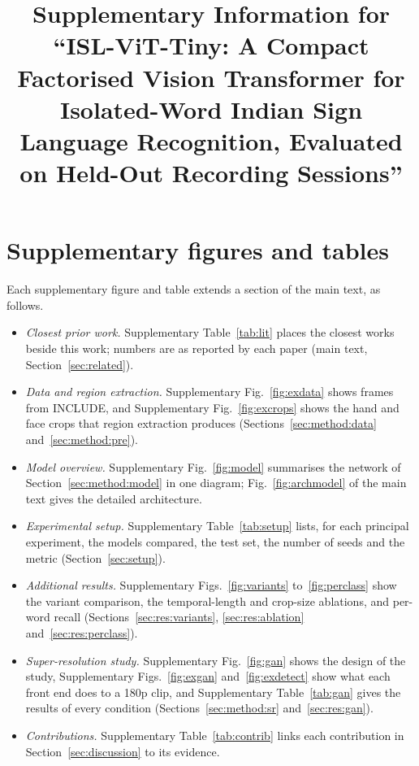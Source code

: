 \documentclass[pdflatex,sn-mathphys-num,onecolumn]{sn-jnl}
\theoremstyle{thmstyleone}%
\begin{document}
\title[Compact factorised ViT for isolated ISL words]{Supplementary Information for ``ISL-ViT-Tiny: A Compact Factorised Vision Transformer for Isolated-Word Indian Sign Language Recognition, Evaluated on Held-Out Recording Sessions''}

\author[1]{ }
\author[1]{ }
\author*[1]{ }
\author[1]{ }


\maketitle

\section{Supplementary figures and tables}\label{supp:items}
Each supplementary figure and table extends a section of the main text, as follows.
\begin{itemize}\setlength{\itemsep}{1pt}\setlength{\parskip}{0pt}
\item \textit{Closest prior work.} Supplementary Table~\ref{tab:lit} places the closest works beside this work; numbers are as reported by each paper (main text, Section~\ref{sec:related}).
\item \textit{Data and region extraction.} Supplementary Fig.~\ref{fig:exdata} shows frames from INCLUDE, and Supplementary Fig.~\ref{fig:excrops} shows the hand and face crops that region extraction produces (Sections~\ref{sec:method:data} and~\ref{sec:method:pre}).
\item \textit{Model overview.} Supplementary Fig.~\ref{fig:model} summarises the network of Section~\ref{sec:method:model} in one diagram; Fig.~\ref{fig:archmodel} of the main text gives the detailed architecture.
\item \textit{Experimental setup.} Supplementary Table~\ref{tab:setup} lists, for each principal experiment, the models compared, the test set, the number of seeds and the metric (Section~\ref{sec:setup}).
\item \textit{Additional results.} Supplementary Figs.~\ref{fig:variants} to~\ref{fig:perclass} show the variant comparison, the temporal-length and crop-size ablations, and per-word recall (Sections~\ref{sec:res:variants}, \ref{sec:res:ablation} and~\ref{sec:res:perclass}).
\item \textit{Super-resolution study.} Supplementary Fig.~\ref{fig:gan} shows the design of the study, Supplementary Figs.~\ref{fig:exgan} and~\ref{fig:exdetect} show what each front end does to a 180p clip, and Supplementary Table~\ref{tab:gan} gives the results of every condition (Sections~\ref{sec:method:sr} and~\ref{sec:res:gan}).
\item \textit{Contributions.} Supplementary Table~\ref{tab:contrib} links each contribution in Section~\ref{sec:discussion} to its evidence.
\end{itemize}
\end{document}
